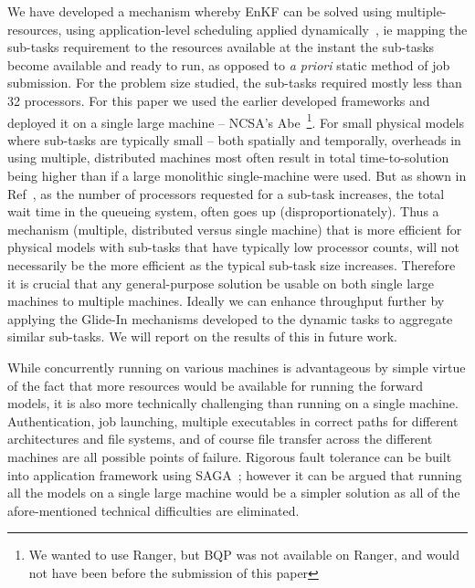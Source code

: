 \documentclass{llncs}
\begin{document}
We have developed a mechanism whereby EnKF can be
solved using multiple-resources, using application-level scheduling
applied dynamically~\cite{saga_tg08}, ie mapping the sub-tasks
requirement to the resources available at the instant the sub-tasks
become available and ready to run, as opposed to {\it a priori} static
method of job submission. For the problem size studied, the sub-tasks
required mostly less than 32 processors. For this paper we used the
earlier developed frameworks and deployed it on a single large machine
-- NCSA's Abe~\footnote{We wanted to use Ranger, but BQP was not
  available on Ranger, and would not have been before the submission
  of this paper}. For small physical models where sub-tasks are
typically small -- both spatially and temporally, overheads in using
multiple, distributed machines most often result in total
time-to-solution being higher than if a large monolithic
single-machine were used. But as shown in
Ref~\cite{novelsubmissionmode}, as the number of processors requested
for a sub-task increases, the total wait time in the queueing system,
often goes up (disproportionately). Thus a mechanism (multiple,
distributed versus single machine) that is more efficient for physical
models with sub-tasks that have typically low processor counts, will
not necessarily be the more efficient as the typical sub-task size
increases. Therefore it is crucial that any general-purpose solution be
usable on both single large machines to multiple machines.
 Ideally we can enhance throughput
further by applying the Glide-In mechanisms developed to the dynamic
tasks to aggregate similar sub-tasks. We will report on the results of
this in future work.


While concurrently running on various machines is advantageous by
simple virtue of the fact that more resources would be available for
running the forward models, it is also more technically challenging
than running on a single machine.  Authentication, job launching,
multiple executables in correct paths for different architectures and
file systems, and of course file transfer across the different
machines are all possible points of failure. Rigorous fault tolerance
can be built into application framework using
SAGA~\cite{Luckow:2008la}; however it can be argued that running all
the models on a single large machine would be a simpler solution as
all of the afore-mentioned technical difficulties are eliminated.
\end{document}
